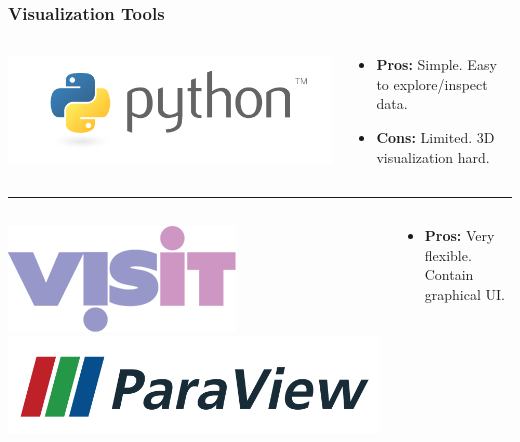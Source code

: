 \documentclass[]{beamer}
\begin{document}
\begin{frame}
  \frametitle{Visualization Tools}
  \begin{columns}
    \begin{column}{6cm}
      \begin{center}
        \includegraphics[width=0.9\columnwidth]{figures/python-logo-master-v3-TM}
      \end{center}
    \end{column}
    \begin{column}{6cm}
      \begin{itemize}
      \item \textbf{\color{green}Pros:} Simple. Easy to explore/inspect data.
      \item \textbf{\color{red}Cons:} Limited. 3D visualization hard.
      \end{itemize}
    \end{column}
  \end{columns}
  \noindent\rule{\textwidth}{1pt}
  \begin{columns}
    \begin{column}{6cm}
      \begin{center}
        \includegraphics[width=0.35\columnwidth]{figures/VisItLogoTrans}
        \includegraphics[width=0.55\columnwidth]{figures/ParaView_Logo}
      \end{center}
    \end{column}
    \begin{column}{6cm}
      \begin{itemize}
      \item \textbf{\color{green}Pros:} Very flexible. Contain graphical UI.

\end{itemize}
\end{column}
\end{columns}
\end{frame}
\end{document}

